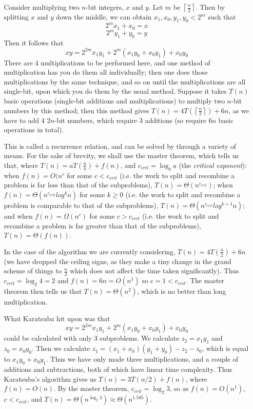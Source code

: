\documentclass[12pt,a4paper]{report}
\begin{document}
\begin{multicols}{2}
\begin{multicols}{2}
Consider multiplying two \(n\)-bit integers, \(x\) and \(y\). Let \(m\) be \(\left\lceil\frac{n}{2}\right\rceil\). Then by splitting \(x\) and \(y\) down the middle, we can obtain \(x_1,x_0,y_1,y_0<2^m\) such that \[2^{m}x_1+x_0=x\]\[2^{m}y_1+y_0=y\]
Then it follows that \[xy=2^{2m}x_1y_1+2^m(x_1y_0+x_0y_1)+x_0y_0\]
There are 4 multiplications to be performed here, and one method of multiplication has you do them all individually; then one does those multiplications by the same technique, and so on until the multiplications are all single-bit, upon which you do them by the usual method. Suppose it takes \(T(n)\) basic operations (single-bit additions and multiplications) to multiply two \(n\)-bit numbers by this method; then this method gives \(T(n)=4T(\left\lceil{}\frac{n}{2}\right\rceil{})+6n\), as we have to add 4 \(2n\)-bit numbers, which require 3 additions (so require \(6n\) basic operations in total).

This is called a recurrence relation, and can be solved by through a variety of means. For the sake of brevity, we shall use the master theorem, which tells us that, where \(T(n)=aT(\frac{n}{b})+f(n)\), and \(c_{crit}=\log_ba\) (the \textit{critical exponent}): when \(f(n)=O(n^c\) for some \(c<c_{crit}\) (i.e. the work to split and recombine a problem is far less than that of the subproblems), \(T(n)=\Theta(n^{c_{crit}})\); when \(f(n)=\Theta(n^{c_{crit}}log^kn)\) for some \(k\geq0\) (i.e. the work to split and recombine a problem is comparable to that of the subproblems), \(T(n)=\Theta(n^{c_{crit}}log^{k+1}n)\); and when \(f(n)=\Omega(n^c)\) for some \(c>c_{crit}\) (i.e. the work to split and recombine a problem is far greater than that of the subproblems), \(T(n)=\Theta(f(n))\).

In the case of the algorithm we are currently considering, \(T(n)=4T(\frac{n}{2})+6n\) (we have dropped the ceiling signs, as they make a tiny change in the grand scheme of things to \(\frac{n}{2}\) which does not affect the time taken significantly). Thus \(c_{crit}=\log_{2}4=2\) and \(f(n)=6n=O(n^1)\) so \(c=1<c_{crit}\). The master theorem then tells us that \(T(n)=\Theta(n^2)\), which is no better than long multiplication.

What Karatsuba hit upon was that \[xy=2^{2m}x_1y_1+2^m(x_1y_0+x_0y_1)+x_0y_0\] could be calculated with only 3 subproblems. We calculate \(z_2=x_1y_1\) and \(z_0=x_0y_0\). Then we calculate \(z_1=(x_1+x_0)(y_1+y_0)-z_2-z_0\), which is equal to \(x_1y_0+x_0y_1\). Thus we have only made three multiplications, and a couple of additions and subtractions, both of which have linear time complexity. Thus Karatsuba's algorithm gives us \(T(n)=3T(n/2)+f(n)\), where \(f(n)=O(n)\). By the master theorem, \(c_{crit}=\log_{2}3\), so as \(f(n)=O(n^1)\), \(c<c_{crit}\), and \(T(n)=\Theta(n^{\log_{2}3})\approx{}\Theta(n^{1.585})\).


\end{multicols}
\end{multicols}
\end{document}

